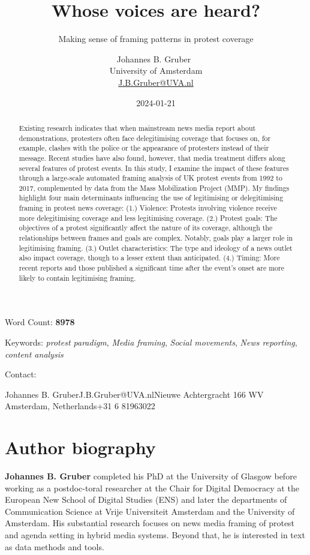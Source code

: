 \documentclass[
]{aft}
\title{Whose voices are heard?}
\subtitle{Making sense of framing patterns in protest coverage}
\author{
Johannes B. Gruber~\orcidlink{0000-0001-9177-1772}\\University of
Amsterdam\\\href{mailto:J.B.Gruber@UVA.nl}{J.B.Gruber@UVA.nl}}
\date{2024-01-21}
\begin{document}
\maketitle
\begin{abstract}
Existing research indicates that when mainstream news media report about
demonstrations, protesters often face delegitimising coverage that
focuses on, for example, clashes with the police or the appearance of
protesters instead of their message. Recent studies have also found,
however, that media treatment differs along several features of protest
events. In this study, I examine the impact of these features through a
large-scale automated framing analysis of UK protest events from 1992 to
2017, complemented by data from the Mass Mobilization Project (MMP). My
findings highlight four main determinants influencing the use of
legitimising or delegitimising framing in protest news coverage: (1.)
Violence: Protests involving violence receive more delegitimising
coverage and less legitimising coverage. (2.) Protest goals: The
objectives of a protest significantly affect the nature of its coverage,
although the relationships between frames and goals are complex.
Notably, goals play a larger role in legitimising framing. (3.) Outlet
characteristics: The type and ideology of a news outlet also impact
coverage, though to a lesser extent than anticipated. (4.) Timing: More
recent reports and those published a significant time after the event's
onset are more likely to contain legitimising framing.
\end{abstract}
\ifdefined\Shaded\renewenvironment{Shaded}{\begin{tcolorbox}[breakable, interior hidden, borderline west={3pt}{0pt}{shadecolor}, boxrule=0pt, enhanced, sharp corners, frame hidden]}{\end{tcolorbox}}\fi

Word Count: \textbf{8978}

Keywords: \emph{protest paradigm}, \emph{Media framing}, \emph{Social
movements}, \emph{News reporting}, \emph{content analysis}

Contact:

Johannes B. Gruber\newline J.B.Gruber@UVA.nl\newline Nieuwe Achtergracht
166 WV Amsterdam, Netherlands\newline +31 6 81963022

\hypertarget{author-biography}{%
\section{Author biography}\label{author-biography}}

\textbf{Johannes B. Gruber} completed his PhD at the University of
Glasgow before working as a postdoc-toral researcher at the Chair for
Digital Democracy at the European New School of Digital Studies (ENS)
and later the departments of Communication Science at Vrije Universiteit
Amsterdam and the University of Amsterdam. His substantial research
focuses on news media framing of protest and agenda setting in hybrid
media systems. Beyond that, he is interested in text as data methods and
tools.
\end{document}
